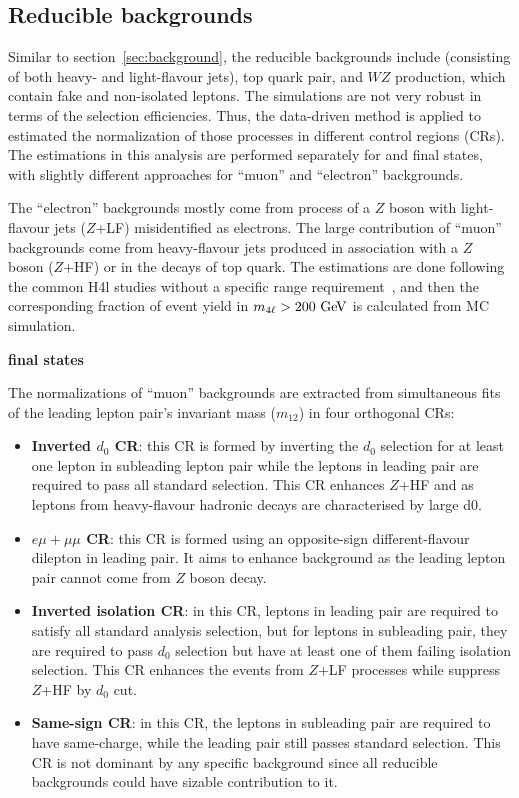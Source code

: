 \subsection{Reducible backgrounds}

Similar to section~\ref{sec:background}, the reducible backgrounds include \Zjet (consisting of both heavy- and light-flavour jets), top quark pair, and $WZ$ production, which contain fake and non-isolated leptons.
The simulations are not very robust in terms of the selection efficiencies.
Thus, the data-driven method is applied to estimated the normalization of those processes in different control regions (CRs).
The estimations in this analysis are performed separately for \llmumu and \llee final states, with slightly different approaches for ``muon'' and ``electron'' backgrounds.

The ``electron'' backgrounds mostly come from process of a $Z$ boson with light-flavour jets ($Z$+LF) misidentified as electrons.
The large contribution of ``muon'' backgrounds come from heavy-flavour jets produced in association with a $Z$ boson ($Z$+HF) or in the decays of top quark.
The estimations are done following the common H4l studies without a specific \mfl range requirement~\cite{PhysRevD.91.012006}, and then the corresponding fraction of event yield in $m_{4\ell} > 200~\text{Ge\kern -0.1em V}$ is calculated from MC simulation.

\textbf{\llmumu final states} 

The normalizations of ``muon'' backgrounds are extracted from simultaneous fits of the leading lepton pair's invariant mass ($m_{12}$) in four orthogonal CRs:
\begin{itemize}
	\item \textbf{Inverted $d_{0}$ CR}: this CR is formed by inverting the $d_{0}$ selection for at least one lepton in subleading lepton pair while the leptons in leading pair are required to pass all standard selection.
This CR enhances $Z$+HF and \ttbar as leptons from heavy-flavour hadronic decays are characterised by large d0.
	\item \textbf{$e\mu+\mu\mu$ CR}: this CR is formed using an opposite-sign different-flavour dilepton in leading pair.
It aims to enhance \ttbar background as the leading lepton pair cannot come from $Z$ boson decay.
	\item \textbf{Inverted isolation CR}: in this CR, leptons in leading pair are required to satisfy all standard analysis selection, but for leptons in subleading pair, they are required to pass $d_{0}$ selection but have at least one of them failing isolation selection.
This CR enhances the events from $Z$+LF processes while suppress $Z$+HF by $d_{0}$ cut.
	\item \textbf{Same-sign CR}: in this CR, the leptons in subleading pair are required to have same-charge, while the leading pair still passes standard selection.
This CR is not dominant by any specific background since all reducible backgrounds could have sizable contribution to it.
\end{itemize}

